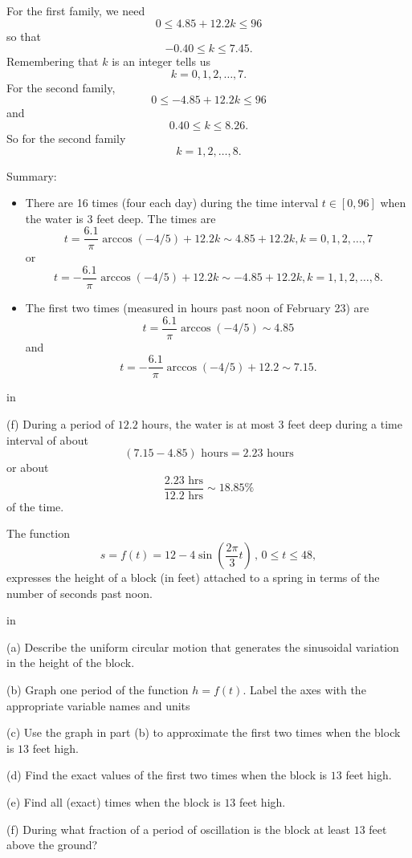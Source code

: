 \documentclass{ximera}
\newcommand{\pskip}{\vskip 0.1 in}
\begin{document}
\begin{example}
\begin{explanation}
For the first family, we need
\[
         0 \leq 4.85 + 12.2 k \leq 96
\]
so that
\[
      -0.40 \leq k \leq 7.45.
\]
Remembering that $k$ is an integer tells us
\[
   k = 0, 1, 2, \ldots ,7.
\]
For the second family,
\[
   0 \leq  - 4.85 + 12.2 k \leq 96
\]
and
\[
       0.40\leq k \leq 8.26 .
\]
So for the second family
\[
     k = 1, 2, \ldots , 8 .
\]

Summary:
\begin{itemize}
\item{There are 16 times (four each day) during the time interval $t\in [0,96]$ when the water is $3$ feet deep. The times are
\[
   t = \frac{6.1}{\pi}\arccos(-4/5) + 12.2k  \sim 4.85 + 12.2k ,  k=0, 1, 2, \ldots , 7
\]
or
\[
      t = -  \frac{6.1}{\pi}\arccos(-4/5) + 12.2k  \sim -4.85 + 12.2k ,  k=1, 1, 2, \ldots , 8.
\]}

\item{
The first two times (measured in hours past noon of February 23) are
\[
    t =  \frac{6.1}{\pi} \arccos(-4/5) \sim 4.85
\]
and 
\[
    t = - \frac{6.1}{\pi}\arccos(-4/5) + 12.2 \sim 7.15 .
\]
}
\end{itemize}

\pskip

(f) During a period of $12.2$ hours, the water is at most $3$ feet deep during a time interval of about
\[
   (7.15 - 4.85) \text { hours} = 2.23 \text{ hours}
\]
or about
\[
    \frac{2.23\text{ hrs}}{12.2 \text{ hrs}} \sim 18.85\%
\]
of the time.
\end{explanation}

\end{example}


\begin{question}  \label{Qert7u8gg}
The function
\[
    s  = f(t) = 12 - 4 \sin \left( \frac{2\pi}{3}t  \right) \, , \, 0\leq t \leq 48 ,
\]
expresses the height of a block (in feet) attached to a spring in terms of the number of seconds past noon.

\pskip

(a) Describe the uniform circular motion that generates the sinusoidal variation in the height of the block.

(b) Graph one period of the function $h=f(t)$. Label the axes with the appropriate variable names and units

(c) Use the graph in part (b) to approximate the first two times when the block is $13$ feet high. 

(d) Find the exact values of the first two times when the block is $13$ feet high. 

(e) Find all (exact) times when the block is $13$ feet high. 

(f) During what fraction of a period of oscillation is the block at least $13$ feet above the ground?

\end{question}
\end{document}
